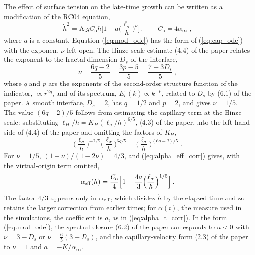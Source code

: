 \documentclass[11pt]{article}
\newcommand{\At}{\mathrm{A_t}}
\newcommand{\lls}{\ell_\sigma}
\newcommand{\hd}{\dot h}
\begin{document}
The effect of surface tension on the late-time growth can be written as a modification of the RC04 equation,
\begin{equation}
  \hd^2 = \At g C_\mathrm{o} h \Big[1 - a \Big(\frac{\lls}{h}\Big)^{\nu}\Big] \, , \qquad C_\mathrm{o} = 4 \alpha_\infty \;,
  \label{eq:mod_ode}
\end{equation}
where $a$ is a constant. Equation (\ref{eq:mod_ode}) has the form of (\ref{eq:cap_ode}) with the exponent $\nu$ left open. The Hinze-scale estimate (4.4) of the paper relates the exponent to the fractal dimension $D_s$ of the interface,
\begin{equation}
  \nu = \frac{6 q - 2}{5} = \frac{3 p - 5}{5} = \frac{7 - 3 D_s}{5} \;,
  \label{eq:mod_nu}
\end{equation}
where $q$ and $p$ are the exponents of the second-order structure function of the indicator, $\propto r^{2 q}$, and of its spectrum, $E_c(k) \propto k^{-p}$, related to $D_s$ by (6.1) of the paper. A smooth interface, $D_s = 2$, has $q = 1/2$ and $p = 2$, and gives $\nu = 1/5$. The value $(6 q - 2)/5$ follows from estimating the capillary term at the Hinze scale: substituting $\ell_H/h = K_H (\lls/h)^{6/5}$, (4.3) of the paper, into the left-hand side of (4.4) of the paper and omitting the factors of $K_H$,
\begin{equation}
  \Big(\frac{\lls}{h}\Big)^{-2/5} \Big(\frac{\lls}{h}\Big)^{6 q/5} = \Big(\frac{\lls}{h}\Big)^{(6 q - 2)/5} \;.
  \label{eq:hinze_nu}
\end{equation}
For $\nu = 1/5$, $(1 - \nu)/(1 - 2 \nu) = 4/3$, and (\ref{eq:alpha_eff_corr}) gives, with the virtual-origin term omitted,
\begin{equation}
  \alpha_{\rm eff}(h) = \frac{C_\mathrm{o}}{4} \Big[1 - \frac{4 a}{3} \Big(\frac{\lls}{h}\Big)^{1/5}\Big] \;.
  \label{eq:mod_aeff}
\end{equation}
The factor $4/3$ appears only in $\alpha_{\rm eff}$, which divides $\hd$ by the elapsed time and so retains the larger correction from earlier times; for $\alpha(t)$, the measure used in the simulations, the coefficient is $a$, as in (\ref{eq:alpha_t_corr}). In the form (\ref{eq:mod_ode}), the spectral closure (6.2) of the paper corresponds to $a < 0$ with $\nu = 3 - D_s$ or $\nu = \tfrac65 (3 - D_s)$, and the capillary-velocity form (2.3) of the paper to $\nu = 1$ and $a = -K/\alpha_\infty$.
\end{document}
